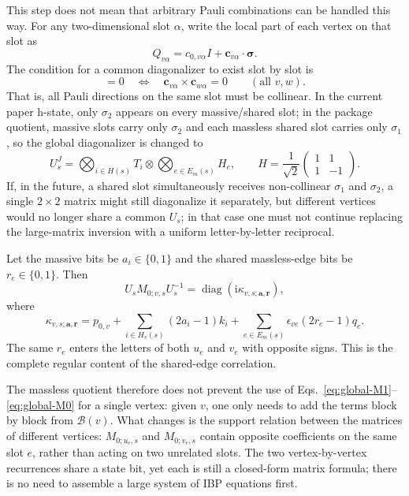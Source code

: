 \documentclass[11pt,a4paper]{article}
\newcommand{\ii}{\mathrm i}
\newcommand{\cB}{\mathcal B}
\begin{document}
This step does not mean that arbitrary Pauli combinations can be handled this way. For any two-dimensional slot $\alpha$, write the local part of each vertex on that slot as
\begin{equation}
 Q_{v\alpha}=c_{0,v\alpha}I+\bm c_{v\alpha}\cdot\bm\sigma.
\end{equation}
The condition for a common diagonalizer to exist slot by slot is
\begin{equation}
 [Q_{v\alpha},Q_{w\alpha}]=0
 \quad\Longleftrightarrow\quad
 \bm c_{v\alpha}\times\bm c_{w\alpha}=0
 \qquad(\text{all }v,w).
 \label{eq:local-common-diagonalization-condition}
\end{equation}
That is, all Pauli directions on the same slot must be collinear. In the current paper h-state, only $\sigma_2$ appears on every massive/shared slot; in the package quotient, massive slots carry only $\sigma_2$ and each massless shared slot carries only $\sigma_1$, so the global diagonalizer is changed to
\begin{equation}
 U_s^J
 =\bigotimes_{i\in H(s)}T_i
 \otimes\bigotimes_{e\in E_m(s)}H_e,
 \qquad
 H=\frac1{\sqrt2}\begin{pmatrix}1&1\\1&-1\end{pmatrix}.
 \label{eq:package-global-diagonalizer}
\end{equation}
If, in the future, a shared slot simultaneously receives non-collinear $\sigma_1$ and $\sigma_2$, a single $2\times2$ matrix might still diagonalize it separately, but different vertices would no longer share a common $U_s$; in that case one must not continue replacing the large-matrix inversion with a uniform letter-by-letter reciprocal.

Let the massive bits be $a_i\in\{0,1\}$ and the shared massless-edge bits be $r_e\in\{0,1\}$. Then
\begin{equation}
 U_sM_{0;v,s}U_s^{-1}
 =\operatorname{diag}\!\left(\ii\kappa_{v,s;\bm a,\bm r}\right),
 \label{eq:global-M0-diagonal}
\end{equation}
where
\begin{equation}
 \boxed{
 \kappa_{v,s;\bm a,\bm r}
 =p_{0,v}
 +\sum_{i\in H_v(s)}(2a_i-1)k_i
 +\sum_{e\in E_m(s)}
 \epsilon_{ve}(2r_e-1)q_e.
 }
 \label{eq:global-energy-letter}
\end{equation}
The same $r_e$ enters the letters of both $u_e$ and $v_e$ with opposite signs. This is the complete regular content of the shared-edge correlation.

The massless quotient therefore does not prevent the use of Eqs.~\eqref{eq:global-M1}--\eqref{eq:global-M0} for a single vertex: given $v$, one only needs to add the terms block by block from $\cB(v)$. What changes is the support relation between the matrices of different vertices: $M_{0;u_e,s}$ and $M_{0;v_e,s}$ contain opposite coefficients on the same slot $e$, rather than acting on two unrelated slots. The two vertex-by-vertex recurrences share a state bit, yet each is still a closed-form matrix formula; there is no need to assemble a large system of IBP equations first.
\end{document}
